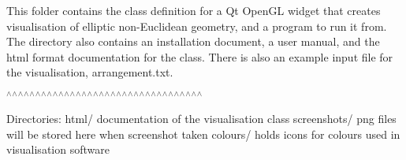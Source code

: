 This folder contains the class definition for a Qt Open\+GL widget that creates visualisation of elliptic non-\/Euclidean geometry, and a program to run it from. The directory also contains an installation document, a user manual, and the html format documentation for the class. There is also an example input file for the visualisation, arrangement.\+txt.

$^\wedge$$^\wedge$$^\wedge$$^\wedge$$^\wedge$$^\wedge$$^\wedge$$^\wedge$$^\wedge$$^\wedge$$^\wedge$$^\wedge$$^\wedge$$^\wedge$$^\wedge$$^\wedge$$^\wedge$$^\wedge$$^\wedge$$^\wedge$$^\wedge$$^\wedge$$^\wedge$$^\wedge$$^\wedge$$^\wedge$$^\wedge$$^\wedge$$^\wedge$$^\wedge$$^\wedge$$^\wedge$$^\wedge$$^\wedge$

Directories\+: html/ documentation of the visualisation class screenshots/ png files will be stored here when screenshot taken colours/ holds icons for colours used in visualisation software 